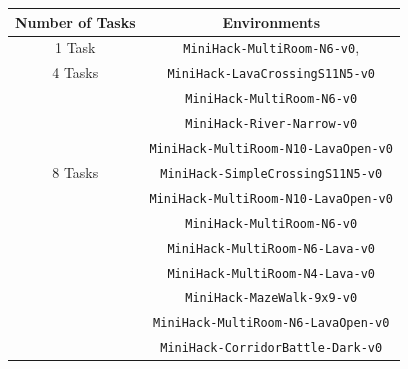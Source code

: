 \begin{table}[!ht]
\centering
\begin{tabular}{c c }
\hline
\textbf{Number of Tasks} & \textbf{Environments} \\
\hline
1 Task  & \texttt{MiniHack-MultiRoom-N6-v0},  \\
\hline
4 Tasks & \texttt{MiniHack-LavaCrossingS11N5-v0} \\
        & \texttt{MiniHack-MultiRoom-N6-v0}\\
        & \texttt{MiniHack-River-Narrow-v0}\\
        & \texttt{MiniHack-MultiRoom-N10-LavaOpen-v0} \\
\hline

8 Tasks &  \texttt{MiniHack-SimpleCrossingS11N5-v0} \\
        & \texttt{MiniHack-MultiRoom-N10-LavaOpen-v0}\\
        &  \texttt{MiniHack-MultiRoom-N6-v0} \\
        & \texttt{MiniHack-MultiRoom-N6-Lava-v0} \\
        &  \texttt{MiniHack-MultiRoom-N4-Lava-v0} \\
        &  \texttt{MiniHack-MazeWalk-9x9-v0} \\
        &   \texttt{MiniHack-MultiRoom-N6-LavaOpen-v0} \\
        &\texttt{MiniHack-CorridorBattle-Dark-v0} \\
\hline


\end{tabular}
\end{table}

